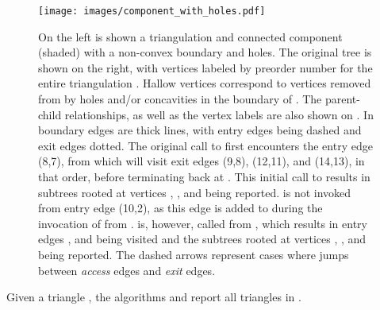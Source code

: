   \begin{figure}[th]
	  \centering
		  \texttt{[image: images/component\_with\_holes.pdf]}
	  \caption[Traversal example on non-convex region with holes]{On the left is shown a 
	  triangulation  and connected component  (shaded) 
	  with a non-convex boundary and holes. 
	  The original tree  is shown on the right, with vertices labeled by preorder 
	  number for the entire triangulation . 
	  Hallow vertices correspond to vertices removed from  by holes and/or 
	  concavities in the boundary of . 
	  The parent-child relationships, as well as the vertex labels are also shown on . 
	  In  boundary edges are thick lines, with entry edges being dashed 
	  and exit edges dotted. 
	  The original call to  first encounters the 
	  entry edge 
	  (8,7), from which  will visit exit edges (9,8), 
	  (12,11), and 
	  (14,13), in that order, before terminating back at . 
	  This initial call to  results in subtrees rooted
	  at vertices 
	  , , and  being reported. 
	   is not invoked from entry edge (10,2), as this 
	  edge is added 
	  to  during the invocation of  from 
	  . 
	   is, however, called from , which results 
	  in entry 
	  edges ,  and  being visited and the subtrees 
	  rooted at vertices , , and  being reported.
	  The dashed arrows represent cases where  jumps 
	  between
	  \emph{access} edges and \emph{exit} edges.}
	  \label{fig:cmp_with_holes}
  \end{figure}

  \begin{lemma}\label{lem:cc_holes_alg_correctness}
  Given a triangle , the algorithms 
   and  report all
  triangles in . 
  \end{lemma}

